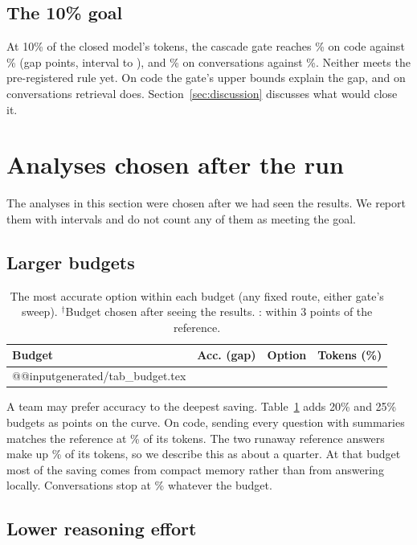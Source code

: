 \documentclass[10pt,twocolumn]{article}
\makeatletter
\newcommand{\rows}[1]{\csname @@input\endcsname generated/#1 }
\makeatother
\begin{document}
\subsection{The 10\% goal}
\label{sec:goal}

At 10\% of the closed model's tokens, the cascade gate reaches \cascadeSwe\% on code against \accSweDirect\% (gap \gapSweFull{} points, interval \gapLoSweFull{} to \gapHiSweFull), and \cascadeLoco\% on conversations against \accLocoDirect\%. Neither meets the pre-registered rule yet. On code the gate's upper bounds explain the gap, and on conversations retrieval does. Section~\ref{sec:discussion} discusses what would close it.

\section{Analyses chosen after the run}
\label{sec:posthoc}

The analyses in this section were chosen after we had seen the results. We report them with intervals and do not count any of them as meeting the goal.

\subsection{Larger budgets}

\begin{table}[t]
\centering
\small
\setlength{\tabcolsep}{4pt}
\caption{The most accurate option within each budget (any fixed route, either gate's sweep). $^\dagger$Budget chosen after seeing the results. \checkmark: within 3 points of the reference.}
\label{tab:budget}
\begin{tabular}{llll}
\toprule
Budget & Acc. (gap) & Option & Tokens (\%)\\
\midrule
\rows{tab_budget.tex}
\bottomrule
\end{tabular}
\end{table}

A team may prefer accuracy to the deepest saving. Table~\ref{tab:budget} adds 20\% and 25\% budgets as points on the curve. On code, sending every question with summaries matches the reference at \budgetQuarterShare\% of its tokens. The two runaway reference answers make up \runawayShare\% of its tokens, so we describe this as about a quarter. At that budget most of the saving comes from compact memory rather than from answering locally. Conversations stop at \locoCeiling\% whatever the budget.

\subsection{Lower reasoning effort}
\end{document}
